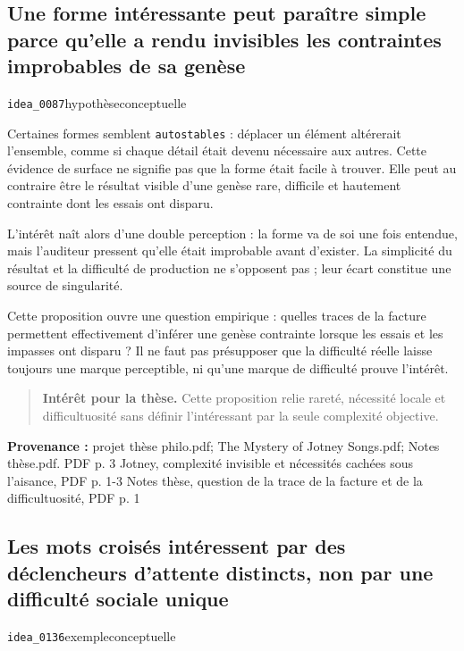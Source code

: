 \documentclass[10pt,a4paper]{article}
\begin{document}
\subsection{Une forme intéressante peut paraître simple parce qu'elle a rendu invisibles les contraintes improbables de sa genèse}
{\small\color{metadata} \texttt{idea\_0087}\quad\textbullet\quad hypothèse\quad\textbullet\quad conceptuelle\par}

Certaines formes semblent \texttt{autostables} : déplacer un élément altérerait l'ensemble, comme si chaque détail était devenu nécessaire aux autres. Cette évidence de surface ne signifie pas que la forme était facile à trouver. Elle peut au contraire être le résultat visible d'une genèse rare, difficile et hautement contrainte dont les essais ont disparu.

L'intérêt naît alors d'une double perception : la forme va de soi une fois entendue, mais l'auditeur pressent qu'elle était improbable avant d'exister. La simplicité du résultat et la difficulté de production ne s'opposent pas ; leur écart constitue une source de singularité.

Cette proposition ouvre une question empirique : quelles traces de la facture permettent effectivement d'inférer une genèse contrainte lorsque les essais et les impasses ont disparu ? Il ne faut pas présupposer que la difficulté réelle laisse toujours une marque perceptible, ni qu'une marque de difficulté prouve l'intérêt.

\begin{quote}
\textbf{Intérêt pour la thèse.} Cette proposition relie rareté, nécessité locale et difficultuosité sans définir l'intéressant par la seule complexité objective.
\end{quote}
{\footnotesize\color{metadata}\textbf{Provenance :} projet thèse philo.pdf; The Mystery of Jotney Songs.pdf; Notes thèse.pdf. PDF p. 3 Jotney, complexité invisible et nécessités cachées sous l'aisance, PDF p. 1-3 Notes thèse, question de la trace de la facture et de la difficultuosité, PDF p. 1\par}

\subsection{Les mots croisés intéressent par des déclencheurs d'attente distincts, non par une difficulté sociale unique}
{\small\color{metadata} \texttt{idea\_0136}\quad\textbullet\quad exemple\quad\textbullet\quad conceptuelle\par}
\end{document}

